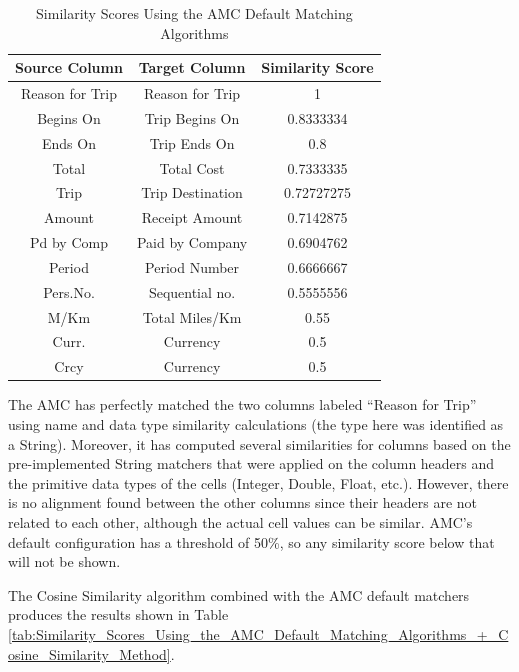 \documentclass{../../Util/LaTEX/sig-alternate}
\begin{document}
\begin{table}[ht]
\centering
\begin{tabular}{|c|c|c|} \hline
\textbf{Source Column} & \textbf{Target Column} & \textbf{Similarity Score} \\ \hline
Reason for Trip & Reason for Trip & 1 \\ \hline
Begins On & Trip Begins On & 0.8333334 \\ \hline
Ends On & Trip Ends On & 0.8 \\ \hline
Total & Total Cost & 0.7333335 \\ \hline
Trip & Trip Destination & 0.72727275 \\ \hline
Amount & Receipt Amount & 0.7142875 \\ \hline
Pd by Comp & Paid by Company & 0.6904762 \\ \hline
Period & Period Number & 0.6666667 \\ \hline
Pers.No. & Sequential no. & 0.5555556 \\ \hline
M/Km & Total Miles/Km & 0.55 \\ \hline
Curr. & Currency & 0.5 \\ \hline
Crcy & Currency & 0.5 \\ \hline
\end{tabular}
\caption{Similarity Scores Using the AMC Default Matching Algorithms}
\label{tab:Similarity_Scores_Using_the_AMC_Default_Matching_Algorithms}
\end{table}

The AMC has perfectly matched the two columns labeled ``Reason for Trip'' using name and data type similarity calculations (the type here was identified as a String). Moreover, it has computed several similarities for columns based on the pre-implemented String matchers that were applied on the column headers and the primitive data types of the cells (Integer, Double, Float, etc.). However, there is no alignment found between the other columns since their headers are not related to each other, although the actual cell values can be similar. AMC's default configuration has a threshold of 50\%, so any similarity score below that will not be shown.

The Cosine Similarity algorithm combined with the AMC default matchers produces the results shown in Table \ref{tab:Similarity_Scores_Using_the_AMC_Default_Matching_Algorithms_+_Cosine_Similarity_Method}.
\end{document}
